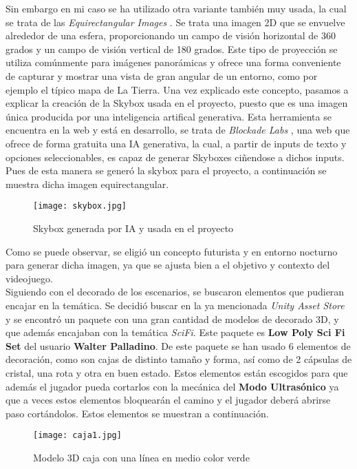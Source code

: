 Sin embargo en mi caso se ha utilizado otra variante también muy usada, la cual se trata de las \textit{Equirectangular Images} \cite{EquirectangularImages}. Se trata una imagen 2D que se envuelve alrededor de una esfera, proporcionando un campo de visión horizontal de 360 grados y un campo de visión vertical de 180 grados. Este tipo de proyección se utiliza comúnmente para imágenes panorámicas y ofrece una forma conveniente de capturar y mostrar una vista de gran angular de un entorno, como por ejemplo el típico mapa de La Tierra.
Una vez explicado este concepto, pasamos a explicar la creación de la Skybox usada en el proyecto, puesto que es una imagen única producida por una inteligencia artifical generativa. Esta herramienta se encuentra en la web y está en desarrollo, se trata de \textit{Blockade Labs} \cite{BlockadeLabs}, una web que ofrece de forma gratuita una IA generativa, la cual, a partir de inputs de texto y opciones seleccionables, es capaz de generar Skyboxes ciñendose a dichos inputs. Pues de esta manera se generó la skybox para el proyecto, a continuación se muestra dicha imagen equirectangular.

\begin{figure}[H]
    \centering
    \texttt{[image: skybox.jpg]}
    \caption{Skybox generada por IA y usada en el proyecto}
\end{figure}

Como se puede observar, se eligió un concepto futurista y en entorno nocturno para generar dicha imagen, ya que se ajusta bien a el objetivo y contexto del videojuego.\\

Siguiendo con el decorado de los escenarios, se buscaron elementos que pudieran encajar en la temática. Se decidió buscar en la ya mencionada \textit{Unity Asset Store} y se encontró un paquete con una gran cantidad de modelos de decorado 3D, y que además encajaban con la temática \textit{SciFi}. Este paquete es \textbf{Low Poly Sci Fi Set} del usuario \textbf{Walter Palladino}. De este paquete se han usado 6 elementos de decoración, como son cajas de distinto tamaño y forma, así como de 2 cápsulas de cristal, una rota y otra en buen estado. Estos elementos están escogidos para que además el jugador pueda cortarlos con la mecánica del \textbf{Modo Ultrasónico} ya que a veces estos elementos bloquearán el camino y el jugador deberá abrirse paso cortándolos.
Estos elementos se muestran a continuación.

\begin{figure}[H]
    \centering
    \texttt{[image: caja1.jpg]}
    \caption{Modelo 3D caja con una línea en medio color verde}
\end{figure}


